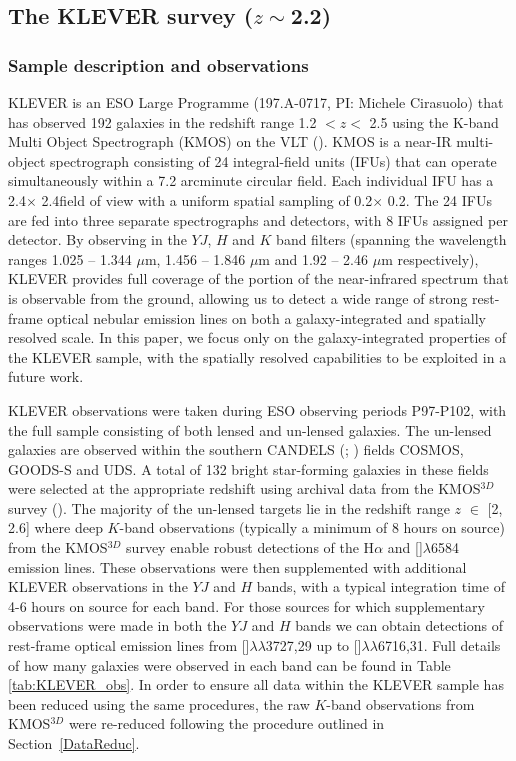 \documentclass[usenatbib]{mnras} %
\begin{document}
\subsection{The KLEVER survey  ($z\sim$2.2)}

\subsubsection{Sample description and observations}
KLEVER is an ESO Large Programme (197.A-0717, PI: Michele Cirasuolo) that has observed 192 galaxies in the redshift range 1.2 $< z <$ 2.5 using the K-band Multi Object Spectrograph (KMOS) on the VLT (\citealt{Sharples_2013}). KMOS is a near-IR multi-object spectrograph consisting of 24 integral-field units (IFUs) that can operate simultaneously within a 7.2 arcminute circular field. Each individual IFU has a 2.4\arcsec $\times$ 2.4\arcsec field of view with a uniform spatial sampling of 0.2\arcsec $\times$ 0.2\arcsec. The 24 IFUs are fed into three separate spectrographs and detectors, with 8 IFUs assigned per detector. By observing in the $YJ$, $H$ and $K$ band filters (spanning the wavelength ranges 1.025 – 1.344 $\mu$m, 1.456 – 1.846 $\mu$m and 1.92 – 2.46 $\mu$m respectively), KLEVER provides full coverage of the portion of the near-infrared spectrum that is observable from the ground, allowing us to  detect a wide range of strong rest-frame optical nebular emission lines on both a galaxy-integrated and spatially resolved scale. In this paper, we focus only on the galaxy-integrated properties of the KLEVER sample, with the spatially resolved capabilities to be exploited in a future work.

KLEVER observations were taken during ESO observing periods P97-P102, with the full sample consisting of both lensed and un-lensed galaxies. The un-lensed galaxies are observed within the southern CANDELS (\citealt{Grogin_2011}; \citealt{Koekemoer_2011}) fields COSMOS, GOODS-S and UDS. A total of 132 bright star-forming galaxies in these fields were selected at the appropriate redshift using archival data from the KMOS$^{3D}$ survey (\citealt{Wisnioski_2015}). The majority of the un-lensed targets lie in the redshift range $z$ $\in$ [2, 2.6] where deep $K$-band observations (typically a minimum of 8 hours on source) from the KMOS$^{3D}$  survey enable robust detections of the H$\alpha$ and []$\lambda$6584 emission lines. These observations were then supplemented with additional KLEVER observations in the $YJ$ and $H$ bands, with a typical integration time of 4-6 hours on source for each band. For those sources for which supplementary observations were made in both the $YJ$ and $H$ bands we can obtain detections of rest-frame optical emission lines from []$\lambda\lambda$3727,29 up to  []$\lambda\lambda$6716,31. Full details of how many galaxies were observed in each band can be found in Table \ref{tab:KLEVER_obs}. In order to ensure all data within the KLEVER sample has been reduced using the same procedures, the raw $K$-band observations from KMOS$^{3D}$ were re-reduced following the procedure outlined in Section~\ref{DataReduc}.
 
\end{document}
